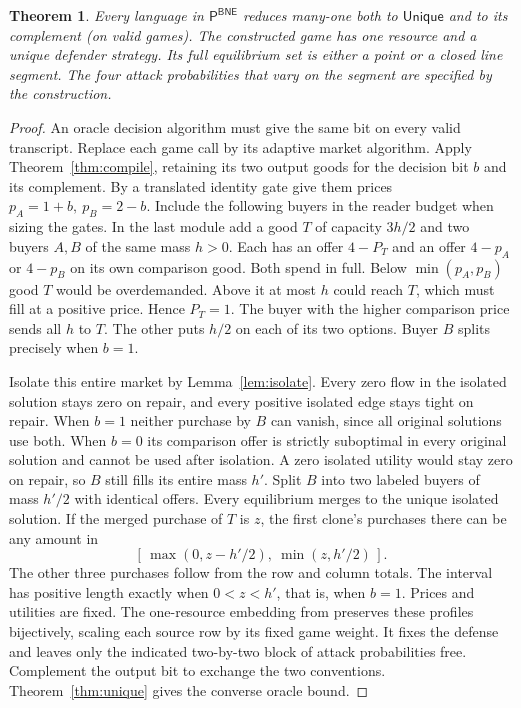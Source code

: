\documentclass[11pt,oneside,openany,notitlepage]{report}
\newtheorem{theorem}{Theorem}[chapter]
\newcommand{\BNE}{\mathsf{BNE}}
\newcommand{\Unique}{\mathsf{Unique}}
\begin{document}
\begin{theorem}\label{thm:shape}
Every language in \(\mathsf P^{\BNE}\) reduces many-one both to
\(\Unique\) and to its complement (on valid games). The constructed game
has one resource and a unique defender strategy. Its full equilibrium set
is either a point or a closed line segment. The four attack probabilities
that vary on the segment are specified by the construction.
\end{theorem}
\begin{proof}
An oracle decision algorithm must give the same bit on every valid
transcript. Replace each game call by its adaptive market algorithm. Apply
Theorem~\ref{thm:compile}, retaining its two output goods for the decision
bit \(b\) and its complement. By a translated identity gate give them
prices \(p_A=1+b,\ p_B=2-b\). Include the following buyers in the reader
budget when sizing the gates. In the last module add a good \(T\) of
capacity \(3h/2\) and two buyers \(A,B\) of the same mass \(h>0\). Each
has an offer \(4-P_T\) and an offer \(4-p_A\) or \(4-p_B\) on its own
comparison good. Both spend in full. Below \(\min(p_A,p_B)\) good \(T\)
would be overdemanded. Above it at most \(h\) could reach \(T\), which
must fill at a positive price. Hence \(P_T=1\). The buyer with the higher
comparison price sends all \(h\) to \(T\). The other puts \(h/2\) on each
of its two options. Buyer \(B\) splits precisely when \(b=1\).

Isolate this entire market by Lemma~\ref{lem:isolate}. Every zero flow in
the isolated solution stays zero on repair, and every positive isolated
edge stays tight on repair. When \(b=1\) neither purchase by \(B\) can
vanish, since all original solutions use both. When \(b=0\) its comparison
offer is strictly suboptimal in every original solution and cannot be used
after isolation. A zero isolated utility would stay zero on repair, so \(B\)
still fills its entire mass \(h'\). Split \(B\) into two labeled buyers
of mass \(h'/2\) with identical offers. Every equilibrium merges to the
unique isolated solution. If the merged purchase of \(T\) is \(z\), the
first clone's purchases there can be any amount in
\[
       [\,\max(0,z-h'/2),\ \min(z,h'/2)\,].
\]
The other three purchases follow from the row and column totals. The
interval has positive length exactly when \(0<z<h'\), that is, when \(b=1\).
Prices and utilities are fixed. The one-resource embedding from
\cite[Theorem~3.16]{book} preserves these profiles bijectively, scaling each
source row by its fixed game weight. It fixes the defense and leaves only
the indicated two-by-two block of attack probabilities free. Complement
the output bit to exchange the two conventions. Theorem~\ref{thm:unique}
gives the converse oracle bound.
\end{proof}
\end{document}
